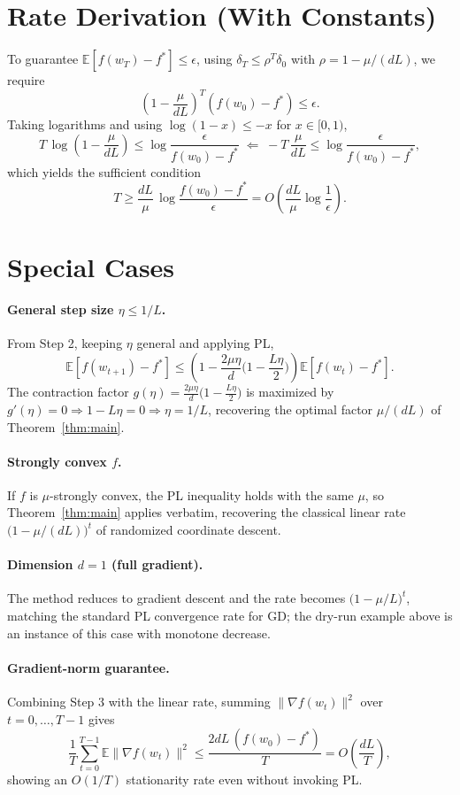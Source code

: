 \documentclass{article}
\begin{document}
\section*{Rate Derivation (With Constants)}

To guarantee $\mathbb{E}[f(w_T)-f^*] \le \epsilon$, using
$\delta_T \le \rho^T \delta_0$ with $\rho = 1-\mu/(dL)$, we require
\[
\left(1 - \frac{\mu}{dL}\right)^{T}(f(w_0)-f^*) \le \epsilon .
\]
Taking logarithms and using $\log(1-x) \le -x$ for $x \in [0,1)$,
\[
T\,\log\!\left(1-\frac{\mu}{dL}\right) \le \log\frac{\epsilon}{f(w_0)-f^*}
\;\Longleftarrow\;
-T\,\frac{\mu}{dL} \le \log\frac{\epsilon}{f(w_0)-f^*},
\]
which yields the sufficient condition
\[
T \ge \frac{dL}{\mu}\,\log\!\frac{f(w_0)-f^*}{\epsilon}
= O\!\left(\frac{dL}{\mu}\log\frac{1}{\epsilon}\right).
\]

\section*{Special Cases}

\paragraph{General step size $\eta \le 1/L$.}
From Step 2, keeping $\eta$ general and applying PL,
\[
\mathbb{E}[f(w_{t+1})-f^*]
\le \left(1 - \frac{2\mu\eta}{d}\Big(1-\frac{L\eta}{2}\Big)\right)
\mathbb{E}[f(w_t)-f^*].
\]
The contraction factor $g(\eta)=\tfrac{2\mu\eta}{d}\big(1-\tfrac{L\eta}{2}\big)$
is maximized by $g'(\eta)=0 \Rightarrow 1-L\eta = 0 \Rightarrow \eta = 1/L$,
recovering the optimal factor $\mu/(dL)$ of Theorem~\ref{thm:main}.

\paragraph{Strongly convex $f$.}
If $f$ is $\mu$-strongly convex, the PL inequality holds with the same $\mu$,
so Theorem~\ref{thm:main} applies verbatim, recovering the classical linear rate
$\big(1-\mu/(dL)\big)^t$ of randomized coordinate descent.

\paragraph{Dimension $d=1$ (full gradient).}
The method reduces to gradient descent and the rate becomes
$\big(1-\mu/L\big)^t$, matching the standard PL convergence rate for GD; the
dry-run example above is an instance of this case with monotone decrease.

\paragraph{Gradient-norm guarantee.}
Combining Step 3 with the linear rate, summing $\|\nabla f(w_t)\|^2$ over
$t=0,\dots,T-1$ gives
\[
\frac{1}{T}\sum_{t=0}^{T-1}\mathbb{E}\|\nabla f(w_t)\|^2
\le \frac{2dL\,(f(w_0)-f^*)}{T} = O\!\left(\frac{dL}{T}\right),
\]
showing an $O(1/T)$ stationarity rate even without invoking PL.
\end{document}
